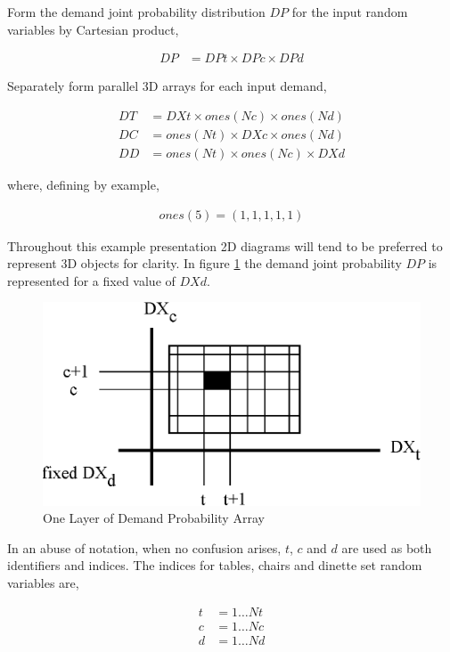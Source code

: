 Form the demand joint probability distribution $DP$ for the input random variables by Cartesian product,

\begin{align*}
DP &= DPt \times DPc \times DPd
\end{align*}

Separately form parallel 3D arrays for each input demand,

\begin{align*}
DT &= DXt \times ones(Nc) \times ones(Nd)\\
DC &= ones(Nt) \times DXc \times ones(Nd)\\
DD &= ones(Nt) \times ones(Nc) \times DXd
\end{align*}

where, defining by example,

\begin{align*}
ones(5) = (1, 1, 1, 1, 1)
\end{align*}

Throughout this example presentation 2D diagrams will tend to be preferred to represent 3D objects for clarity. In figure \ref{fig:tcd_rectangle} the demand joint probability $DP$ is represented for a fixed value of $DXd$.

\begin{figure}
  \centering
  \includegraphics{Images/tcd_rectangle}
  \caption[One Layer of Demand Probability Array]
          {One Layer of Demand Probability Array}
  \label{fig:tcd_rectangle}
\end{figure}

In an abuse of notation, when no confusion arises, $t$, $c$ and $d$ are used as both identifiers and indices. The indices for tables, chairs and dinette set random variables are,

\begin{align*}
t &= 1 \dots Nt\\
c &= 1 \dots Nc\\
d &= 1 \dots Nd
\end{align*}

